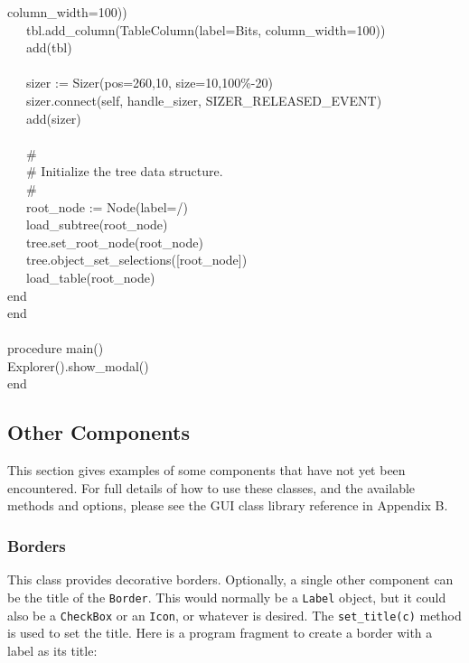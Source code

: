 {{\textquotedbl}column\_width=100{\textquotedbl})) \\
\>   \ \ \ tbl.add\_column(TableColumn({\textquotedbl}label=Bits{\textquotedbl},
{\textquotedbl}column\_width=100{\textquotedbl})) \\
\>   \ \ \ add(tbl) \\
\ \\
\>   \ \ \ sizer := Sizer({\textquotedbl}pos=260,10{\textquotedbl},
{\textquotedbl}size=10,100\%-20{\textquotedbl}) \\
\>   \ \ \ sizer.connect(self,
{\textquotedbl}handle\_sizer{\textquotedbl}, SIZER\_RELEASED\_EVENT) \\
\>   \ \ \ add(sizer) \\
\ \\
\>   \ \ \ \# \\
\>   \ \ \ \# Initialize the tree data structure. \\
\>   \ \ \ \# \\
\>   \ \ \ root\_node := Node({\textquotedbl}label=/{\textquotedbl}) \\
\>   \ \ \ load\_subtree(root\_node) \\
\>   \ \ \ tree.set\_root\_node(root\_node) \\
\>   \ \ \ tree.object\_set\_selections([root\_node]) \\
\>   \ \ \ load\_table(root\_node) \\
\>   end \\
end \\
\ \\
procedure main() \\
\>   Explorer().show\_modal() \\
end
}

\subsection{Other Components}

This section gives examples of some components that have not yet been
encountered. For full details of how to use these classes, and the
available methods and options, please see the GUI class library
reference in Appendix B.

\subsubsection[Borders]{Borders}
This class provides decorative borders. Optionally, a single other
component can be the title of the \texttt{Border}. This would normally
be a \texttt{Label} object, but it could also be a \texttt{CheckBox} or
an \texttt{Icon}, or whatever is desired. The \texttt{set\_title(c)}
method is used to set the title. Here is a program fragment to create a
border with a label as its title:

